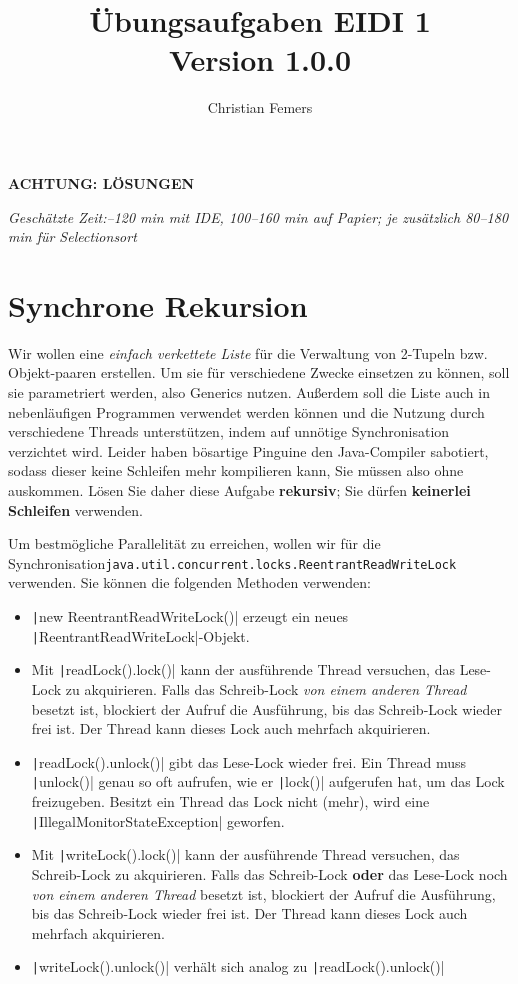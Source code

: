 \documentclass[11pt]{exam} %
\title{Übungsaufgaben EIDI 1 \\ \small \color{magenta}Version 1.0.0}
\author{Christian Femers}
\newcommand{\code}[1]{\texttt|#1|}
\begin{document}
\maketitle

\ifprintanswers
\begin{framed}{\vspace{8.5cm}\begin{center}\color{red}\textbf{ACHTUNG: LÖSUNGEN}\end{center}\vspace{8.75cm}}\end{framed}
\newpage
\else
\emph{Geschätzte Zeit:–120 min mit IDE, 100–160 min auf Papier; je zusätzlich 80–180 min für Selectionsort}
\fi

\section{Synchrone Rekursion}
Wir wollen eine \emph{einfach verkettete Liste} für die Verwaltung von 2-Tupeln bzw. Objekt-paaren erstellen. Um sie für verschiedene Zwecke einsetzen zu können, soll sie parametriert werden, also Generics nutzen. Außerdem soll die Liste auch in nebenläufigen Programmen verwendet werden können und die Nutzung durch verschiedene Threads unterstützen, indem auf unnötige Synchronisation verzichtet wird. Leider haben bösartige Pinguine den Java-Compiler sabotiert, sodass dieser keine Schleifen mehr kompilieren kann, Sie müssen also ohne auskommen. Lösen Sie daher diese Aufgabe \textbf{rekursiv}; Sie dürfen \textbf{keinerlei Schleifen} verwenden.\par
Um bestmögliche Parallelität zu erreichen, wollen wir für die Synchronisation\newline \texttt{java.util.concurrent.locks.ReentrantReadWriteLock} verwenden. Sie können die folgenden Methoden verwenden:
\begin{itemize}
\item \code{new ReentrantReadWriteLock()} erzeugt ein neues \code{ReentrantReadWriteLock}-Objekt.
\item Mit \code{readLock().lock()} kann der ausführende Thread versuchen, das Lese-Lock zu akquirieren. Falls das Schreib-Lock \emph{von einem anderen Thread} besetzt ist, blockiert der Aufruf die Ausführung, bis das Schreib-Lock wieder frei ist. Der Thread kann dieses Lock auch mehrfach akquirieren.
\item \code{readLock().unlock()} gibt das Lese-Lock wieder frei. Ein Thread muss \code{unlock()} genau so oft aufrufen, wie er \code{lock()} aufgerufen hat, um das Lock freizugeben. Besitzt ein Thread das Lock nicht (mehr), wird eine \code{IllegalMonitorStateException} geworfen.
\item Mit \code{writeLock().lock()} kann der ausführende Thread versuchen, das Schreib-Lock zu akquirieren. Falls das Schreib-Lock \textbf{oder} das Lese-Lock noch \emph{von einem anderen Thread} besetzt ist, blockiert der Aufruf die Ausführung, bis das Schreib-Lock wieder frei ist. Der Thread kann dieses Lock auch mehrfach akquirieren.
\item \code{writeLock().unlock()} verhält sich analog zu \code{readLock().unlock()}
\end{itemize}
\end{document}
